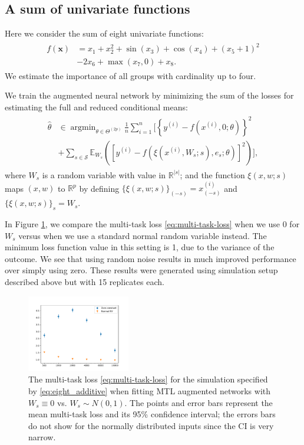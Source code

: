 \documentclass{article}
\DeclareMathOperator{\argmin}{\arg\min}
\begin{document}
\subsection{A sum of univariate functions}

Here we consider the sum of eight univariate functions:
\begin{align}
\begin{split}
f(\boldsymbol{x}) &= x_1 + x_2^2 + \sin(x_3) + \cos(x_4) + (x_5 + 1)^2\\
& - 2x_6 + \max(x_7, 0) + x_8.
\end{split}
\label{eq:eight_additive}
\end{align}
We estimate the importance of all groups with cardinality up to four.

We train the augmented neural network by minimizing the sum of the losses for estimating the full and reduced conditional means:
\begin{align}
\begin{split}
\hat{\theta} &\in \argmin_{\theta \in \Theta^{(2p)}} \frac{1}{n} \sum_{i=1}^n 
\bigg[
\left\{y^{(i)} - f(x^{(i)}, 0; \theta)\right\}^2
\\
&+ \sum_{s \in \mathcal{S}}
\mathbb{E}_{W_s}\left(
\left[y^{(i)} - f(\xi(x^{(i)}, W_s;s), e_s; \theta)\right]^2
\right)
\bigg ],
\end{split}
\label{eq:multi-task-loss}
\end{align}
where $W_s$ is a random variable with value in $\mathbb{R}^{|s|}$; and the function $\xi(x, w; s)$ maps $(x, w)$ to $\mathbb{R}^{p}$ by defining $\{\xi(x, w; s)\}_{(-s)} = x^{(i)}_{(-s)}$ and $\{\xi(x, w; s)\}_s = W_s$.

In Figure \ref{fig:zero_vs_random}, we compare the multi-task loss \eqref{eq:multi-task-loss} when we use 0 for $W_s$ versus when we use a standard normal random variable instead. The minimum loss function value in this setting is 1, due to the variance of the outcome. We see that using random noise results in much improved performance over simply using zero. These results were generated using simulation setup described above but with 15 replicates each.

\begin{figure}
\includegraphics[width=0.4\textwidth]{images/compare_zero_v_random}
\caption{
The multi-task loss \eqref{eq:multi-task-loss} for the simulation specified by \eqref{eq:eight_additive} when fitting MTL augmented networks with $W_s \equiv 0$ vs. $W_s \sim N(0,1)$. The points and error bars represent the mean multi-task loss and its 95\% confidence interval; the errors bars do not show for the normally distributed inputs since the CI is very narrow.
}
\label{fig:zero_vs_random}
\end{figure}
\end{document}
